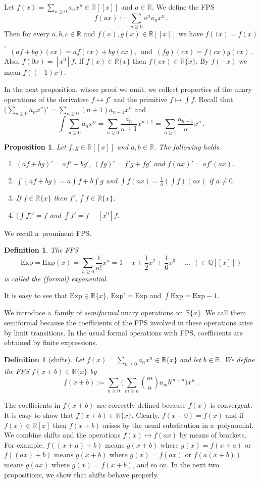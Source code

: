 \documentclass[10pt]{article}
\def\Q{\mathbb{Q}}
\def\R{\mathbb{R}}
\def\ds{\dots}
\newtheorem{prop}[thm]{Proposition}
\newtheorem{defi}[thm]{Definition}
\begin{document}
Let $f(x)=\sum_{n\ge0}a_nx^n\in\R[[x]]$ and $a\in\R$. We define the FPS
$$
{\textstyle
f(ax):=\sum_{n\ge0}a^na_nx^n\,.
}
$$
Then for every 
$a,b,c\in\R$ and $f(x),g(x)\in\R[[x]]$ we have 
$f(1x)=f(x)$, 
$$
(af+bg)(cx)=af(cx)+bg(cx),\,\text{ and }\,(fg)(cx)=f(cx)g(cx)\,. 
$$
Also, $f(0x)=[x^0]f$. If $f(x)\in \R\{x\}$ 
then $f(cx)\in\R\{x\}$. By 
$f(-x)$ we mean $f((-1)x)$.

In the 
next proposition, whose proof we omit, we 
collect properties of the 
unary operations of the derivative $f\mapsto f'$ and the primitive 
$f\mapsto\int f$. Recall that $\big(\sum_{n\ge0}a_nx^n\big)'=\sum_{n\ge0}(n+1)a_{n+1}x^n$ and 
$$
{\textstyle
\int\sum_{n\ge0}a_nx^n=\sum_{n\ge0}\frac{a_n}{n+1}x^{n+1}=
\sum_{n\ge1}\frac{a_{n-1}}{n}x^n\,.
}
$$

\begin{prop}\label{prop_formDeri}
Let $f,g\in\R[[x]]$ and $a,b\in\R$. The following holds.
\begin{enumerate}
\item $(af+bg)'=af'+bg'$, $(fg)'=f'g+fg'$ and $f(ax)'=af'(ax)$.
\item $\int(af+bg)=a\int f+b\int g$ and $\int f(ax)=\frac{1}{a}(\int f)(ax)$ if $a\ne0$.
\item  If $f\in\R\{x\}$ then $f',
\int f\in\R\{x\}$.
\item $\big(\int f\big)'=f$ and $\int f'=f-[x^0]f$.
\end{enumerate}
\end{prop}

We recall a~prominent FPS.

\begin{defi}\label{def_formExp}
The {\em FPS}
$${\textstyle
\mathrm{Exp}=
\mathrm{Exp}(x)=\sum_{n\ge0}\frac{1}{n!}x^n=
1+x+\frac{1}{2}x^2+\frac{1}{6}x^3+\ds\ \ (\in\Q[[x]])
}
$$
is called the (formal) exponential.
\end{defi}
It is easy to see that 
$\mathrm{Exp}\in\R\{x\}$, $\mathrm{Exp}'=\mathrm{Exp}$ and 
$\int\mathrm{Exp}=\mathrm{Exp}-1$.

We introduce a~family of 
{\em semiformal} unary operations on 
$\R\{x\}$. We call them semiformal because the coefficients of the 
FPS involved in these operations arise by limit transitions. In the 
usual formal operations with FPS, coefficients are obtained by finite expressions.

\begin{defi}[shifts]\label{def_formShif}
Let  $f(x)=\sum_{n\ge0}a_nx^n\in
\R\{x\}$ and let $b\in\R$. We define the {\em FPS} $f(x+b)\in\R\{x\}$ by
$$
{\textstyle
f(x+b):=\sum_{n\ge0}\big(\sum_{m\ge n}\binom{m}{n}a_mb^{m-n}\big)x^n\;.
}
$$    
\end{defi}
The coefficients in $f(x+b)$ are correctly defined because $f(x)$ is 
convergent. It is easy to show that $f(x+b)\in\R\{x\}$. Clearly, 
$f(x+0)=f(x)$ and if 
$f(x)\in\R[x]$ then $f(x+b)$ arises by the usual substitution in 
a~polynomial. We combine shifts and the operations $f(x)\mapsto f(ax)$ by 
means of brackets. For example, $f((x+a)+b)$ means $g(x+b)$ where 
$g(x)=f(x+a)$ or 
$f((ax)+b)$ means $g(x+b)$ where $g(x)=f(ax)$ or $f(a(x+b))$ means $g(ax)$ where $g(x)=f(x+b)$, and so on.
In the next two propositions, we show that shifts behave properly.  
\end{document}
